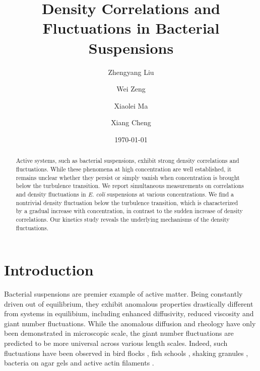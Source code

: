 \documentclass[twocolumn,aps,pre,amsmath,amssymb,floatfix,longbibliography]{revtex4-1}
\begin{document}
\title{Density Correlations and Fluctuations in Bacterial Suspensions}

\author{Zhengyang Liu}
\author{Wei Zeng}
\author{Xiaolei Ma}
\author{Xiang Cheng}



\date{\today}

\begin{abstract}
Active systems, such as bacterial suspensions, exhibit strong density correlations and  fluctuations. While these phenomena at high concentration are well established, it remains unclear whether they persist or simply vanish when concentration is brought below the turbulence transition. We report simultaneous measurements on correlations and density fluctuations in \textit{E. coli} suspensions at various concentrations. We find a nontrivial density fluctuation below the turbulence transition, which is characterized by a gradual increase with concentration, in contrast to the sudden increase of density correlations. Our kinetics study reveals the underlying mechanisms of the density fluctuations.
\end{abstract}

\maketitle
\section{Introduction}

Bacterial suspensions are premier example of active matter. Being constantly driven out of equilibrium, they exhibit anomalous properties drastically different from systems in equilibium, including enhanced diffusivity, reduced viscosity and giant number fluctuations. While the anomalous diffusion and rheology have only been demonstrated in microscopic scale, the giant number fluctuations are predicted to be more universal across various length scales. Indeed, such fluctuations have been observed in bird flocks \cite{Ballerini1232}, fish schools \cite{Ward6948}, shaking granules \cite{Narayan105}, bacteria on agar gels \cite{Zhang13626} and active actin filaments \cite{Schaller4488}.
\end{document}
